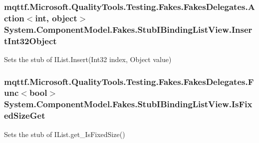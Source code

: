 \hypertarget{class_system_1_1_component_model_1_1_fakes_1_1_stub_i_binding_list_view_a5026de76e6fc8db18f80357f76f6d559}{
\subsubsection[{Insert\-Int32\-Object}]{\setlength{\rightskip}{0pt plus 5cm}mqttf.\-Microsoft.\-Quality\-Tools.\-Testing.\-Fakes.\-Fakes\-Delegates.\-Action$<$int, object$>$ System.\-Component\-Model.\-Fakes.\-Stub\-I\-Binding\-List\-View.\-Insert\-Int32\-Object}}\label{class_system_1_1_component_model_1_1_fakes_1_1_stub_i_binding_list_view_a5026de76e6fc8db18f80357f76f6d559}


Sets the stub of I\-List.\-Insert(\-Int32 index, Object value)

\hypertarget{class_system_1_1_component_model_1_1_fakes_1_1_stub_i_binding_list_view_a27c8a97359a9a0779058820f6e188f93}{
\subsubsection[{Is\-Fixed\-Size\-Get}]{\setlength{\rightskip}{0pt plus 5cm}mqttf.\-Microsoft.\-Quality\-Tools.\-Testing.\-Fakes.\-Fakes\-Delegates.\-Func$<$bool$>$ System.\-Component\-Model.\-Fakes.\-Stub\-I\-Binding\-List\-View.\-Is\-Fixed\-Size\-Get}}\label{class_system_1_1_component_model_1_1_fakes_1_1_stub_i_binding_list_view_a27c8a97359a9a0779058820f6e188f93}


Sets the stub of I\-List.\-get\-\_\-\-Is\-Fixed\-Size()

